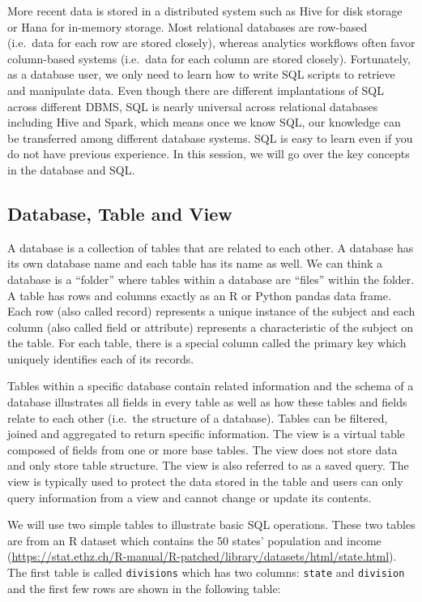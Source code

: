 \documentclass[
  12pt,
]{krantz}
\begin{document}
More recent data is stored in a distributed system such as Hive for disk storage or Hana for in-memory storage. Most relational databases are row-based (i.e.~data for each row are stored closely), whereas analytics workflows often favor column-based systems (i.e.~data for each column are stored closely). Fortunately, as a database user, we only need to learn how to write SQL scripts to retrieve and manipulate data. Even though there are different implantations of SQL across different DBMS, SQL is nearly universal across relational databases including Hive and Spark, which means once we know SQL, our knowledge can be transferred among different database systems. SQL is easy to learn even if you do not have previous experience. In this session, we will go over the key concepts in the database and SQL.

\hypertarget{database-table-and-view}{%
\subsection{Database, Table and View}\label{database-table-and-view}}

A database is a collection of tables that are related to each other. A database has its own database name and each table has its name as well. We can think a database is a ``folder'' where tables within a database are ``files'' within the folder. A table has rows and columns exactly as an R or Python pandas data frame. Each row (also called record) represents a unique instance of the subject and each column (also called field or attribute) represents a characteristic of the subject on the table. For each table, there is a special column called the primary key which uniquely identifies each of its records.

Tables within a specific database contain related information and the schema of a database illustrates all fields in every table as well as how these tables and fields relate to each other (i.e.~the structure of a database). Tables can be filtered, joined and aggregated to return specific information. The view is a virtual table composed of fields from one or more base tables. The view does not store data and only store table structure. The view is also referred to as a saved query. The view is typically used to protect the data stored in the table and users can only query information from a view and cannot change or update its contents.

We will use two simple tables to illustrate basic SQL operations. These two tables are from an R dataset which contains the 50 states' population and income (\url{https://stat.ethz.ch/R-manual/R-patched/library/datasets/html/state.html}). The first table is called \texttt{divisions} which has two columns: \texttt{state} and \texttt{division} and the first few rows are shown in the following table:
\end{document}
